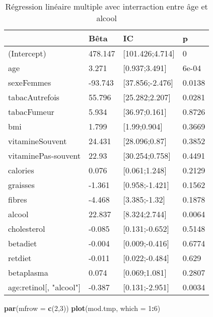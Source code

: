 \documentclass[]{article}
\newenvironment{Shaded}{\begin{snugshade}}{\end{snugshade}}
\newcommand{\KeywordTok}[1]{\textcolor[rgb]{0.13,0.29,0.53}{\textbf{#1}}}
\newcommand{\DataTypeTok}[1]{\textcolor[rgb]{0.13,0.29,0.53}{#1}}
\newcommand{\DecValTok}[1]{\textcolor[rgb]{0.00,0.00,0.81}{#1}}
\newcommand{\OperatorTok}[1]{\textcolor[rgb]{0.81,0.36,0.00}{\textbf{#1}}}
\newcommand{\NormalTok}[1]{#1}
\begin{document}
\begin{table}

\caption{\label{tab:unnamed-chunk-55}Régression linéaire multiple avec interraction entre âge et alcool}
\centering
\begin{tabular}[t]{l|l|l|l}
\hline
  & Bêta & IC & p\\
\hline
\rowcolor[HTML]{BBD2E1}  (Intercept) & 478.147 & [101.426;4.714] & 0\\
\hline
age & 3.271 & [0.937;3.491] & 6e-04\\
\hline
\rowcolor[HTML]{BBD2E1}  sexeFemmes & -93.743 & [37.856;-2.476] & 0.0138\\
\hline
tabacAutrefois & 55.796 & [25.282;2.207] & 0.0281\\
\hline
\rowcolor[HTML]{BBD2E1}  tabacFumeur & 5.934 & [36.97;0.161] & 0.8726\\
\hline
bmi & 1.799 & [1.99;0.904] & 0.3669\\
\hline
\rowcolor[HTML]{BBD2E1}  vitamineSouvent & 24.431 & [28.096;0.87] & 0.3852\\
\hline
vitaminePas-souvent & 22.93 & [30.254;0.758] & 0.4491\\
\hline
\rowcolor[HTML]{BBD2E1}  calories & 0.076 & [0.061;1.248] & 0.2129\\
\hline
graisses & -1.361 & [0.958;-1.421] & 0.1562\\
\hline
\rowcolor[HTML]{BBD2E1}  fibres & -4.468 & [3.385;-1.32] & 0.1878\\
\hline
alcool & 22.837 & [8.324;2.744] & 0.0064\\
\hline
\rowcolor[HTML]{BBD2E1}  cholesterol & -0.085 & [0.131;-0.652] & 0.5148\\
\hline
betadiet & -0.004 & [0.009;-0.416] & 0.6774\\
\hline
\rowcolor[HTML]{BBD2E1}  retdiet & -0.011 & [0.022;-0.484] & 0.629\\
\hline
betaplasma & 0.074 & [0.069;1.081] & 0.2807\\
\hline
\rowcolor[HTML]{BBD2E1}  age:retinol[, "alcool"] & -0.387 & [0.131;-2.951] & 0.0034\\
\hline
\end{tabular}
\end{table}

\begin{Shaded}
\begin{Highlighting}[]
\KeywordTok{par}\NormalTok{(}\DataTypeTok{mfrow =} \KeywordTok{c}\NormalTok{(}\DecValTok{2}\NormalTok{,}\DecValTok{3}\NormalTok{))}
\KeywordTok{plot}\NormalTok{(mod.tmp, }\DataTypeTok{which =} \DecValTok{1}\OperatorTok{:}\DecValTok{6}\NormalTok{)}
\end{Highlighting}
\end{Shaded}
\end{document}
